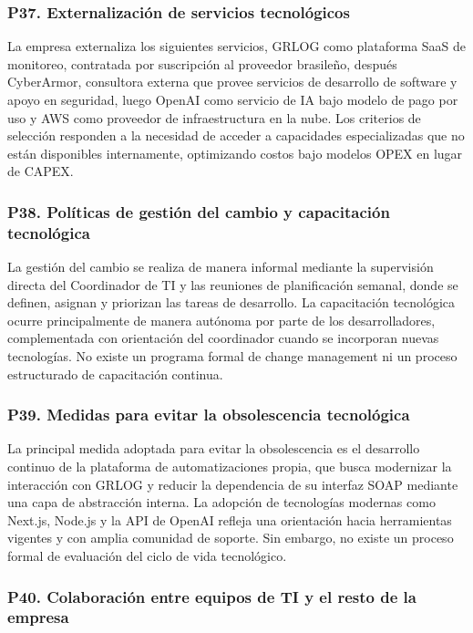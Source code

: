 \documentclass[12pt]{article}
\begin{document}
\subsubsection*{\textbf{P37. Externalizaci\'on de servicios tecnol\'ogicos}}

La empresa externaliza los siguientes servicios, GRLOG como plataforma SaaS
de monitoreo, contratada por suscripci\'on al proveedor brasile\~no, después CyberArmor,
consultora externa que provee servicios de desarrollo de software y apoyo en seguridad, luego OpenAI como servicio de IA bajo modelo de pago por uso y AWS
como proveedor de infraestructura en la nube. Los criterios de selecci\'on responden a la
necesidad de acceder a capacidades especializadas que no est\'an disponibles internamente,
optimizando costos bajo modelos OPEX en lugar de CAPEX.

\subsubsection*{\textbf{P38. Pol\'iticas de gesti\'on del cambio y capacitaci\'on tecnol\'ogica}}

La gesti\'on del cambio se realiza de manera informal mediante la supervisi\'on directa
del Coordinador de TI y las reuniones de planificaci\'on semanal, donde se definen,
asignan y priorizan las tareas de desarrollo. La capacitaci\'on tecnol\'ogica ocurre
principalmente de manera aut\'onoma por parte de los desarrolladores, complementada con
orientaci\'on del coordinador cuando se incorporan nuevas tecnolog\'ias. No existe un
programa formal de change management ni un proceso estructurado de capacitaci\'on continua.

\subsubsection*{\textbf{P39. Medidas para evitar la obsolescencia tecnol\'ogica}}

La principal medida adoptada para evitar la obsolescencia es el desarrollo continuo de la
plataforma de automatizaciones propia, que busca modernizar la interacci\'on con
GRLOG y reducir la dependencia de su interfaz SOAP mediante una capa de abstracci\'on
interna. La adopci\'on de tecnolog\'ias modernas como Next.js, Node.js y la API de OpenAI
refleja una orientaci\'on hacia herramientas vigentes y con amplia comunidad de soporte.
Sin embargo, no existe un proceso formal de evaluaci\'on del ciclo de vida tecnol\'ogico.

\subsubsection*{\textbf{P40. Colaboraci\'on entre equipos de TI y el resto de la empresa}}
\end{document}
